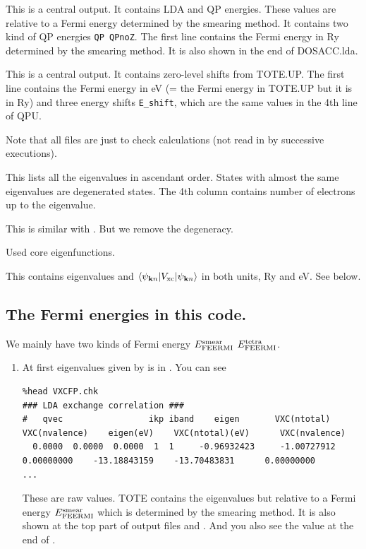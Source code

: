 {
This is a central output.
It contains LDA and QP energies. These values are 
relative to a Fermi energy determined by the smearing method.
It contains two kind of QP energies {\tt QP QPnoZ}.
The first line contains the Fermi energy in Ry determined by the smearing method.
It is also shown in the end of {\sf DOSACC.lda}.

This is a central output.
It contains zero-level shifts from {\sf TOTE.UP}.
The first line contains the Fermi energy in eV 
(= the Fermi energy in {\sf TOTE.UP} but it is in Ry)
and three energy shifts {\tt E\_shift}, which are the same values in the 4th line of {\sf QPU}.

\vspace{1cm}

Note that all  files are just to check calculations
(not read in by successive executions).


This lists all the eigenvalues in ascendant order.
States with almost the same eigenvalues are degenerated states.
The 4th column contains number of electrons up to the eigenvalue.

This is similar with .
But we remove the degeneracy.

Used core eigenfunctions.

This contains eigenvalues and 
$\langle \psi_{{\bf k} n} |V_{\rm xc} |\psi_{{\bf k} n}\rangle$
in both units, Ry and eV. See below.


\vspace{1cm}

\subsection {The Fermi energies in this \GW code.}
We mainly have two kinds of Fermi energy $E_{\rm FEERMI}^{\rm smear}$ 
$E_{\rm FEERMI}^{\rm tetra}$.

\begin{enumerate}
\item 
At first eigenvalues given by  is in . You can see
{\baselineskip=3mm \small
\begin{verbatim}
%head VXCFP.chk
### LDA exchange correlation ###
#   qvec                 ikp iband    eigen       VXC(ntotal)     VXC(nvalence)    eigen(eV)    VXC(ntotal)(eV)      VXC(nvalence)
  0.0000  0.0000  0.0000  1  1     -0.96932423     -1.00727912      0.00000000    -13.18843159    -13.70483831      0.00000000
...
\end{verbatim}}
These are raw values.
{\sf TOTE} contains the eigenvalues but relative to a Fermi energy
$E_{\rm FEERMI}^{\rm smear}$ which is determined by the smearing method.
It is also shown at the top part of output files  and .
And you also see the value at the end of .\\


\end{enumerate}}

